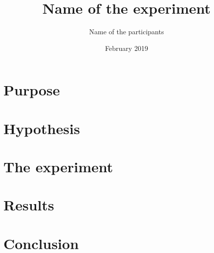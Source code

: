 \documentclass{article}
\title{Name of the experiment}
\author{Name of the participants}
\date{February 2019}
\begin{document}
\section{Purpose}

\section{Hypothesis}

\section{The experiment}

\section{Results}

\section{Conclusion}
\end{document}
